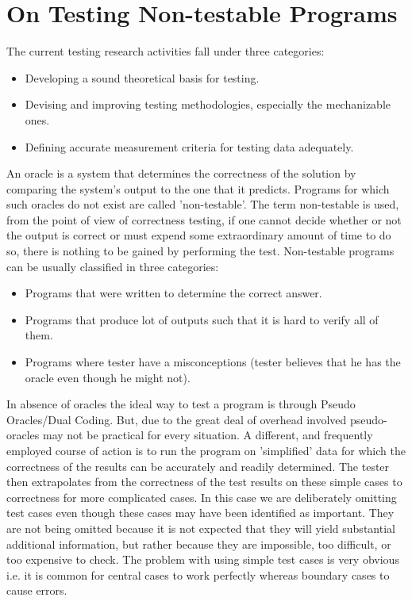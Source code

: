 \section{On Testing Non-testable Programs}
The current testing research activities fall under three categories:
\begin{itemize}
  \item Developing a sound theoretical basis for testing.
  \item Devising and improving testing methodologies, especially the mechanizable ones.
  \item Defining accurate measurement criteria for testing data adequately.
\end{itemize}
An oracle is a system that determines the correctness of the solution by comparing the system’s output to the one that it predicts. Programs for which such oracles do not exist are called 'non-testable'. The term non-testable is used, from the point of view of correctness testing, if one cannot decide whether or not the output is correct or must expend some extraordinary amount of time to do so, there is nothing to be gained by performing the test.
Non-testable programs can be usually classified in three categories:
\begin{itemize}
  \item Programs that were written to determine the correct answer.
  \item Programs that produce lot of outputs such that it is hard to verify all of them.
  \item Programs where tester have a misconceptions (tester believes that he has the oracle even though he might not).
\end{itemize}
In absence of oracles the ideal way to test a program is through Pseudo Oracles/Dual Coding. But, due to the great deal of overhead involved pseudo-oracles may not be practical for every situation. A different, and frequently employed course of action is to run the program on 'simplified' data for which the correctness of the results can be accurately and readily determined. The tester then extrapolates from the correctness of the test results on these simple cases to correctness for more complicated cases. In this case we are deliberately omitting test cases even though these cases may have been identified as important. They are not being omitted because it is not expected that they will yield substantial additional information, but rather because they are impossible, too difficult, or too expensive to check. The problem with using simple test cases is very obvious i.e. it is common for central cases to work perfectly whereas boundary cases to cause errors.

